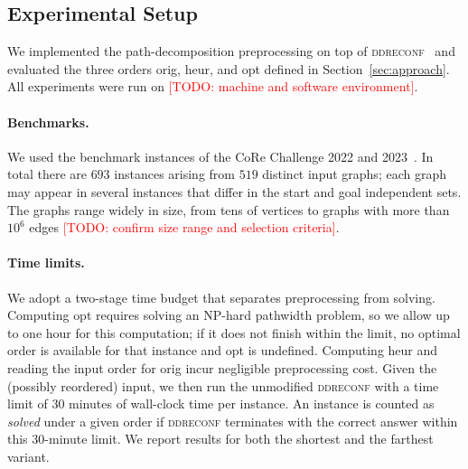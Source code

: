 \documentclass[conference]{IEEEtran}
\newcommand{\todo}[1]{\textcolor{red}{[TODO: #1]}}
\newcommand{\OrigDecom}{\textsf{orig}\xspace}
\newcommand{\HeurDecom}{\textsf{heur}\xspace}
\newcommand{\OptDecom}{\textsf{opt}\xspace}
\begin{document}
\subsection{Experimental Setup}
\label{subsec:setup}
 
We implemented the path-decomposition preprocessing on top of
\textsc{ddreconf}~\cite{ItoKNSSTT23} and evaluated the three orders
\OrigDecom, \HeurDecom, and \OptDecom defined in Section~\ref{sec:approach}.
All experiments were run on \todo{machine and software environment}.
 
\paragraph{Benchmarks.}
We used the benchmark instances of the CoRe Challenge 2022 and
2023~\cite{sotaokit24}. In total there are $693$ instances arising from $519$
distinct input graphs; each graph may appear in several instances that differ in
the start and goal independent sets.
The graphs range widely in size, from tens of vertices to graphs with more than
$10^{6}$ edges \todo{confirm size range and selection criteria}.
 
\paragraph{Time limits.}
We adopt a two-stage time budget that separates preprocessing from solving.
Computing \OptDecom requires solving an NP-hard pathwidth problem, so we allow up
to one hour for this computation; if it does not finish within the limit, no
optimal order is available for that instance and \OptDecom is undefined.
Computing \HeurDecom and reading the input order for \OrigDecom incur negligible
preprocessing cost.
Given the (possibly reordered) input, we then run the unmodified
\textsc{ddreconf} with a time limit of $30$ minutes of wall-clock time per
instance. An instance is counted as \emph{solved} under a given order if
\textsc{ddreconf} terminates with the correct answer within this $30$-minute
limit.
We report results for both the shortest and the farthest variant.
 
\end{document}
